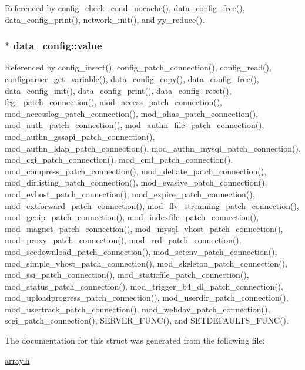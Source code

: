 Referenced by config\-\_\-check\-\_\-cond\-\_\-nocache(), data\-\_\-config\-\_\-free(), data\-\_\-config\-\_\-print(), network\-\_\-init(), and yy\-\_\-reduce().

\hypertarget{structdata__config_a166f134074b3cdb339cd6f981079f97d}{
\subsubsection[{value}]{$\ast$ data\-\_\-config\-::value}}\label{structdata__config_a166f134074b3cdb339cd6f981079f97d}


Referenced by config\-\_\-insert(), config\-\_\-patch\-\_\-connection(), config\-\_\-read(), configparser\-\_\-get\-\_\-variable(), data\-\_\-config\-\_\-copy(), data\-\_\-config\-\_\-free(), data\-\_\-config\-\_\-init(), data\-\_\-config\-\_\-print(), data\-\_\-config\-\_\-reset(), fcgi\-\_\-patch\-\_\-connection(), mod\-\_\-access\-\_\-patch\-\_\-connection(), mod\-\_\-accesslog\-\_\-patch\-\_\-connection(), mod\-\_\-alias\-\_\-patch\-\_\-connection(), mod\-\_\-auth\-\_\-patch\-\_\-connection(), mod\-\_\-authn\-\_\-file\-\_\-patch\-\_\-connection(), mod\-\_\-authn\-\_\-gssapi\-\_\-patch\-\_\-connection(), mod\-\_\-authn\-\_\-ldap\-\_\-patch\-\_\-connection(), mod\-\_\-authn\-\_\-mysql\-\_\-patch\-\_\-connection(), mod\-\_\-cgi\-\_\-patch\-\_\-connection(), mod\-\_\-cml\-\_\-patch\-\_\-connection(), mod\-\_\-compress\-\_\-patch\-\_\-connection(), mod\-\_\-deflate\-\_\-patch\-\_\-connection(), mod\-\_\-dirlisting\-\_\-patch\-\_\-connection(), mod\-\_\-evasive\-\_\-patch\-\_\-connection(), mod\-\_\-evhost\-\_\-patch\-\_\-connection(), mod\-\_\-expire\-\_\-patch\-\_\-connection(), mod\-\_\-extforward\-\_\-patch\-\_\-connection(), mod\-\_\-flv\-\_\-streaming\-\_\-patch\-\_\-connection(), mod\-\_\-geoip\-\_\-patch\-\_\-connection(), mod\-\_\-indexfile\-\_\-patch\-\_\-connection(), mod\-\_\-magnet\-\_\-patch\-\_\-connection(), mod\-\_\-mysql\-\_\-vhost\-\_\-patch\-\_\-connection(), mod\-\_\-proxy\-\_\-patch\-\_\-connection(), mod\-\_\-rrd\-\_\-patch\-\_\-connection(), mod\-\_\-secdownload\-\_\-patch\-\_\-connection(), mod\-\_\-setenv\-\_\-patch\-\_\-connection(), mod\-\_\-simple\-\_\-vhost\-\_\-patch\-\_\-connection(), mod\-\_\-skeleton\-\_\-patch\-\_\-connection(), mod\-\_\-ssi\-\_\-patch\-\_\-connection(), mod\-\_\-staticfile\-\_\-patch\-\_\-connection(), mod\-\_\-status\-\_\-patch\-\_\-connection(), mod\-\_\-trigger\-\_\-b4\-\_\-dl\-\_\-patch\-\_\-connection(), mod\-\_\-uploadprogress\-\_\-patch\-\_\-connection(), mod\-\_\-userdir\-\_\-patch\-\_\-connection(), mod\-\_\-usertrack\-\_\-patch\-\_\-connection(), mod\-\_\-webdav\-\_\-patch\-\_\-connection(), scgi\-\_\-patch\-\_\-connection(), S\-E\-R\-V\-E\-R\-\_\-\-F\-U\-N\-C(), and S\-E\-T\-D\-E\-F\-A\-U\-L\-T\-S\-\_\-\-F\-U\-N\-C().



The documentation for this struct was generated from the following file\-:\begin{DoxyCompactItemize}
\item 
\hyperlink{array_8h}{array.\-h}\end{DoxyCompactItemize}
